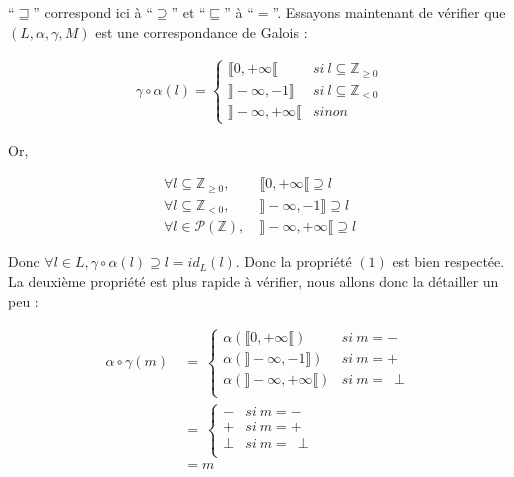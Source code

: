 \documentclass[french]{article}
\newcommand\si{\textit{si}}
\newcommand\sinon{\textit{sinon}}
\begin{document}
  ``$\sqsupseteq$'' correspond ici à ``$\supseteq$'' et ``$\sqsubseteq$'' à ``$=$''. Essayons maintenant de vérifier que $(L, \alpha, \gamma, M)$ est une correspondance de Galois :
  
  \begin{align*}
    \gamma \circ \alpha (l) = \left\{ 
    \begin{array}{ll}
      \llbracket 0, +\infty\llbracket & \si\ l \subseteq \mathds{Z}_{\geq 0}\\
      \rrbracket -\infty, -1\rrbracket & \si\ l \subseteq \mathds{Z}_{< 0}\\
      \rrbracket -\infty, +\infty\llbracket & \sinon\
    \end{array} \right.
  \end{align*}
  
  Or,
  
  \begin{align*}
    \forall l \subseteq \mathds{Z}_{\geq 0},\ & \llbracket 0, +\infty\llbracket \supseteq l\\
    \forall l \subseteq \mathds{Z}_{< 0},\    & \rrbracket -\infty, -1\rrbracket \supseteq l\\
    \forall l \in \mathscr{P}(\mathds{Z}),\   & \rrbracket -\infty, +\infty\llbracket \supseteq l
  \end{align*}
  
  Donc $\forall l \in L, \gamma \circ \alpha (l) \supseteq l = id_L(l)$. Donc la propriété $(1)$ est bien respectée.
  La deuxième propriété est plus rapide à vérifier, nous allons donc la détailler un peu :
  
  \begin{align*}
    \alpha \circ \gamma (m)\ &=\ \left\{ 
    \begin{array}{ll}
      \alpha (\llbracket 0, +\infty\llbracket) & \si\ m = -\\
      \alpha (\rrbracket -\infty, -1\rrbracket) & \si\ m = +\\
      \alpha (\rrbracket -\infty, +\infty\llbracket)  & \si\ m =\ \perp\\
    \end{array} \right.\\
    &= \ \left\{ 
    \begin{array}{ll}
      - & \si\ m = -\\
      + & \si\ m = +\\
      \perp  & \si\ m =\ \perp\\
    \end{array} \right.\\
    &= m
  \end{align*}
  
\end{document}
